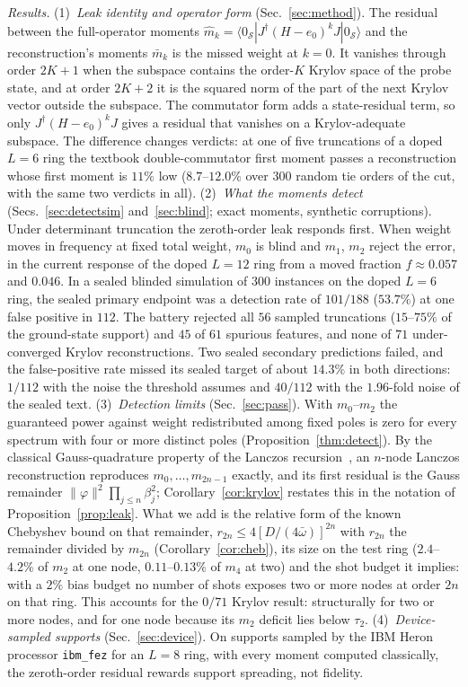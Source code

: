 \documentclass[aps,prb,reprint,onecolumn,12pt,superscriptaddress,longbibliography,floatfix]{revtex4-2}
\begin{document}
\emph{Results.} (1)~\emph{Leak identity and operator form} (Sec.~\ref{sec:method}). The residual between the full-operator moments $\widehat m_k=\langle 0_\mathcal S|J^\dagger(H-e_0)^kJ|0_\mathcal S\rangle$ and the reconstruction's moments $\bar m_k$ is the missed weight at $k=0$. It vanishes through order $2K+1$ when the subspace contains the order-$K$ Krylov space of the probe state, and at order $2K+2$ it is the squared norm of the part of the next Krylov vector outside the subspace. The commutator form adds a state-residual term, so only $J^\dagger(H-e_0)^kJ$ gives a residual that vanishes on a Krylov-adequate subspace. The difference changes verdicts: at one of five truncations of a doped $L=6$ ring the textbook double-commutator first moment passes a reconstruction whose first moment is $11\%$ low ($8.7$--$12.0\%$ over $300$ random tie orders of the cut, with the same two verdicts in all).
(2)~\emph{What the moments detect} (Secs.~\ref{sec:detectsim} and~\ref{sec:blind}; exact moments, synthetic corruptions). Under determinant truncation the zeroth-order leak responds first. When weight moves in frequency at fixed total weight, $m_0$ is blind and $m_1$, $m_2$ reject the error, in the current response of the doped $L=12$ ring from a moved fraction $f\approx0.057$ and $0.046$. In a sealed blinded simulation of $300$ instances on the doped $L=6$ ring, the sealed primary endpoint was a detection rate of $101/188$ ($53.7\%$) at one false positive in $112$. The battery rejected all $56$ sampled truncations ($15$--$75\%$ of the ground-state support) and $45$ of $61$ spurious features, and none of $71$ under-converged Krylov reconstructions. Two sealed secondary predictions failed, and the false-positive rate missed its sealed target of about $14.3\%$ in both directions: $1/112$ with the noise the threshold assumes and $40/112$ with the $1.96$-fold noise of the sealed text.
(3)~\emph{Detection limits} (Sec.~\ref{sec:pass}). With $m_0$--$m_2$ the guaranteed power against weight redistributed among fixed poles is zero for every spectrum with four or more distinct poles (Proposition~\ref{thm:detect}). By the classical Gauss-quadrature property of the Lanczos recursion~\cite{Lanczos1950,GolubWelsch1969,GM2010,Haydock1975,ViswanathMuller1994}, an $n$-node Lanczos reconstruction reproduces $m_0,\dots,m_{2n-1}$ exactly, and its first residual is the Gauss remainder $\|\varphi\|^2\prod_{j\le n}\beta_j^2$; Corollary~\ref{cor:krylov} restates this in the notation of Proposition~\ref{prop:leak}. What we add is the relative form of the known Chebyshev bound on that remainder, $r_{2n}\le4[D/(4\bar\omega)]^{2n}$ with $r_{2n}$ the remainder divided by $m_{2n}$ (Corollary~\ref{cor:cheb}), its size on the test ring ($2.4$--$4.2\%$ of $m_2$ at one node, $0.11$--$0.13\%$ of $m_4$ at two) and the shot budget it implies: with a $2\%$ bias budget no number of shots exposes two or more nodes at order $2n$ on that ring. This accounts for the $0/71$ Krylov result: structurally for two or more nodes, and for one node because its $m_2$ deficit lies below $\tau_2$.
(4)~\emph{Device-sampled supports} (Sec.~\ref{sec:device}). On supports sampled by the IBM Heron processor \texttt{ibm\_fez} for an $L=8$ ring, with every moment computed classically, the zeroth-order residual rewards support spreading, not fidelity.
\end{document}
